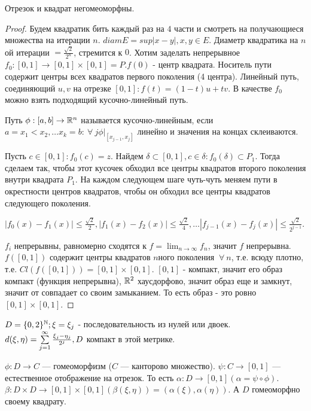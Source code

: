 \documentclass[12pt]{report}
\begin{document}
\begin{rem}
Отрезок и квадрат негомеоморфны.
\end{rem}
\begin{proof}
Будем квадратик бить каждый раз на $4$ части и смотреть на получающиеся множества на итерации $n$. $diam E = sup|x - y|, x, y \in E$. Диаметр квадратика на $n$ой итерации $ = \frac{\sqrt{2}}{2^n}$, стремится к $0$. Хотим заделать непрерывное $f_0: [0, 1] \to [0, 1] \times [0, 1] = P. f(0)$ - центр квадрата. Носитель пути содержит центры всех квадратов первого поколения (4 центра). Линейный путь, соединяющий $u, v$ на отрезке $[0, 1]: f(t) = (1 - t)u + tv$. В качестве $f_0$ можно взять подходящий кусочно-линейный путь. 

\begin{defn}
Путь $\phi: [a, b] \to \mathbb{R}^n$ называется кусочно-линейным, если $a = x_1 < x_2 , \dots x_k = b: ~\forall ~j \phi|_{[x_{j - 1}, x_j]}$ линейно и значения на концах склеиваются.
\end{defn}

Пусть $c \in [0, 1]: f_0(c) = z$. Найдем $\delta \subset [0, 1], c \in \delta: f_0(\delta) \subset P_1$. Тогда сделаем так, чтобы этот кусочек обходил все центры квадратов второго поколения внутри квадрата $P_1$. На каждом следующем шаге чуть-чуть меняем пути в окрестности центров квадратов, чтобы он обходил все центры квадратов следующего поколения.

$|f_0(x) - f_1(x)| \le \frac{\sqrt{2}}{2}, |f_1(x) - f_2(x)| \le \frac{\sqrt{2}}{4}, \dots |f_{j - 1}(x) - f_j(x)| \le \frac{\sqrt{2}}{2^{j - 1}}$.

$f_i$ непрерывны, равномерно сходятся к $f = \lim_{n \to \infty}{f_n}$, значит $f$ непрерывна. $f([0, 1])$ содержит центры квадратов $n$ного поколения $~\forall ~n$, т.е. всюду плотно, т.е. $Cl(f([0, 1])) = [0, 1] \times [0, 1]$. $[0, 1]$ - компакт, значит его образ компакт (функция непрерывна), $\mathbb{R}^2$ хаусдорфово, значит образ еще и замкнут, значит от совпадает со своим замыканием. То есть образ - это ровно $[0, 1] \times [0, 1]$.
\end{proof}

\begin{note}
$D = \{0, 2\}^{\mathbb{N}}; \xi  = {\xi_j}$ - последовательность из нулей или двоек. $d(\xi, \eta) = \sum\limits_{j = 1}^\infty{\frac{\xi_j - \eta_j}{2^j}}, D$ компакт в этой метрике.

$\phi: D \to C$ --- гомеоморфизм ($C$ --- канторово множество). $\psi: C \to [0, 1]$ --- естественное отображение на отрезок. То есть $\alpha: D \to [0, 1] (\alpha = \psi \circ \phi)$. $\beta: D \times D \to [0, 1] \times [0, 1] (\beta(\xi, \eta)) = (\alpha(\xi), \alpha(\eta))$. А $D$ гомеоморфно своему квадрату.
\end{note}
\end{document}
